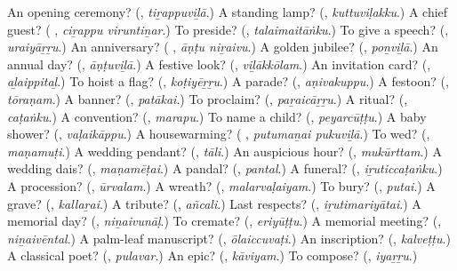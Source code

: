 \begin{tcolorbox}[breakable,colback=teal!4,colframe=teal!35!black,title={Before you move on}]
An opening ceremony? (\textbf{}, \emph{tiṟappuviḻā}.) A standing lamp? (\textbf{}, \emph{kuttuviḷakku}.) A chief guest? (\textbf{ }, \emph{ciṟappu viruntiṉar}.) To preside? (\textbf{}, \emph{talaimaitāṅku}.) To give a speech? (\textbf{}, \emph{uraiyāṟṟu}.) An anniversary? (\textbf{ }, \emph{āṇṭu niṟaivu}.) A golden jubilee? (\textbf{}, \emph{poṉviḻā}.) An annual day? (\textbf{}, \emph{āṇṭuviḻā}.) A festive look? (\textbf{}, \emph{viḻākkōlam}.) An invitation card? (\textbf{}, \emph{aḻaippitaḻ}.) To hoist a flag? (\textbf{}, \emph{koṭiyēṟṟu}.) A parade? (\textbf{}, \emph{aṇivakuppu}.) A festoon? (\textbf{}, \emph{tōraṇam}.) A banner? (\textbf{}, \emph{patākai}.) To proclaim? (\textbf{}, \emph{paṟaicāṟṟu}.) A ritual? (\textbf{}, \emph{caṭaṅku}.) A convention? (\textbf{}, \emph{marapu}.) To name a child? (\textbf{}, \emph{peyarcūṭṭu}.) A baby shower? (\textbf{}, \emph{vaḷaikāppu}.) A housewarming? (\textbf{ }, \emph{putumaṉai pukuviḻā}.) To wed? (\textbf{}, \emph{maṇamuṭi}.) A wedding pendant? (\textbf{}, \emph{tāli}.) An auspicious hour? (\textbf{}, \emph{mukūrttam}.) A wedding dais? (\textbf{}, \emph{maṇamēṭai}.) A pandal? (\textbf{}, \emph{pantal}.) A funeral? (\textbf{}, \emph{iṟuticcaṭaṅku}.) A procession? (\textbf{}, \emph{ūrvalam}.) A wreath? (\textbf{}, \emph{malarvaḷaiyam}.) To bury? (\textbf{}, \emph{putai}.) A grave? (\textbf{}, \emph{kallaṟai}.) A tribute? (\textbf{}, \emph{añcali}.) Last respects? (\textbf{}, \emph{iṟutimariyātai}.) A memorial day? (\textbf{}, \emph{niṉaivunāḷ}.) To cremate? (\textbf{}, \emph{eriyūṭṭu}.) A memorial meeting? (\textbf{}, \emph{niṉaivēntal}.) A palm-leaf manuscript? (\textbf{}, \emph{ōlaiccuvaṭi}.) An inscription? (\textbf{}, \emph{kalveṭṭu}.) A classical poet? (\textbf{}, \emph{pulavar}.) An epic? (\textbf{}, \emph{kāviyam}.) To compose? (\textbf{}, \emph{iyaṟṟu}.)
\end{tcolorbox}
